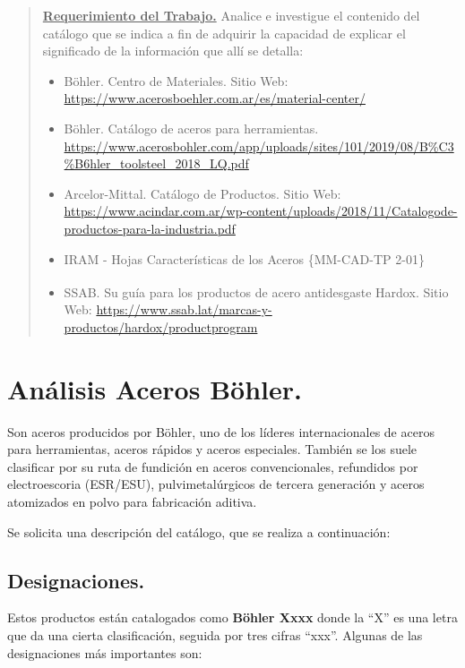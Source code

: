 \documentclass[12pt,a4paper]{article}
\begin{document}

\tableofcontents
\begin{abstract}
    \underline{\textbf{Requerimiento del Trabajo.}}
    Analice e investigue el contenido del catálogo que se indica a fin de adquirir la capacidad de explicar el significado de la información que allí se detalla:
    \begin{itemize}
        \item Böhler. Centro de Materiales. Sitio Web: \url{https://www.acerosboehler.com.ar/es/material-center/}
        \item Böhler. Catálogo de aceros para herramientas. \url{https://www.acerosbohler.com/app/uploads/sites/101/2019/08/B%C3%B6hler_toolsteel_2018_LQ.pdf}
        \item Arcelor-Mittal. Catálogo de Productos. Sitio Web: \url{https://www.acindar.com.ar/wp-content/uploads/2018/11/Catalogode-productos-para-la-industria.pdf}
        \item IRAM - Hojas Características de los Aceros \{MM-CAD-TP 2-01\}
        \item SSAB. Su guía para los productos de acero antidesgaste Hardox\textsuperscript{\textregistered}. Sitio Web: \url{https://www.ssab.lat/marcas-y-productos/hardox/productprogram}
    \end{itemize}
\end{abstract}

\section{Análisis Aceros Böhler.}
Son aceros producidos por Böhler, uno de los líderes internacionales de aceros para herramientas, aceros rápidos y aceros especiales. También se los suele clasificar por su ruta de fundición en aceros convencionales, refundidos por electroescoria (ESR/ESU), pulvimetalúrgicos de tercera generación y aceros atomizados en polvo para fabricación aditiva.

Se solicita una descripción del catálogo, que se realiza a continuación:

\subsection{Designaciones.}
Estos productos están catalogados como \textbf{Böhler Xxxx} donde la “X” es una letra que da una cierta clasificación, seguida por tres cifras “xxx”. Algunas de las designaciones más importantes son:
\end{document}
